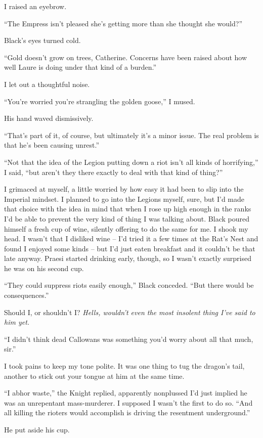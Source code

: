 \documentclass[12pt, openany]{book}
\begin{document}
I raised an eyebrow.

“The Empress isn’t pleased she’s getting more than she thought she would?”

Black’s eyes turned cold.

“Gold doesn’t grow on trees, Catherine. Concerns have been raised about how well Laure is doing under that kind of a burden.”

I let out a thoughtful noise.

“You’re worried you’re strangling the golden goose,” I mused.

His hand waved dismissively.

“That’s part of it, of course, but ultimately it’s a minor issue. The real problem is that he’s been causing unrest.”

“Not that the idea of the Legion putting down a riot isn’t all kinds of horrifying,” I said, “but aren’t they there exactly to deal with that kind of thing?”

I grimaced at myself, a little worried by how easy it had been to slip into the Imperial mindset. I planned to go into the Legions myself, sure, but I’d made that choice with the idea in mind that when I rose up high enough in the ranks I’d be able to prevent the very kind of thing I was talking about. Black poured himself a fresh cup of wine, silently offering to do the same for me. I shook my head. I wasn’t that I disliked wine – I’d tried it a few times at the Rat’s Nest and found I enjoyed some kinds – but I’d just eaten breakfast and it couldn’t be that late anyway. Praesi started drinking early, though, so I wasn’t exactly surprised he was on his second cup.

“They could suppress riots easily enough,” Black conceded. “But there would be consequences.”

Should I, or shouldn’t I? \textit{Hells, wouldn’t even the most insolent thing I’ve said to him yet.}

“I didn’t think dead Callowans was something you’d worry about all that much, sir.”

I took pains to keep my tone polite. It was one thing to tug the dragon’s tail, another to stick out your tongue at him at the same time.

“I abhor waste,” the Knight replied, apparently nonplussed I’d just implied he was an unrepentant mass-murderer. I supposed I wasn’t the first to do so. “And all killing the rioters would accomplish is driving the resentment underground.”

He put aside his cup.
\end{document}
